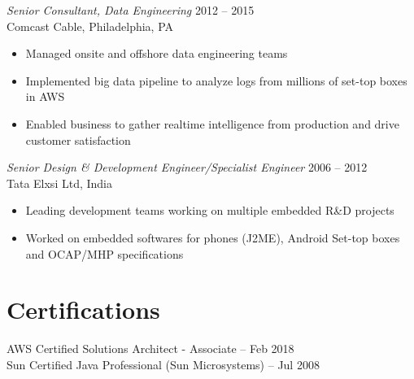 \documentclass[margin]{res}
\begin{document}
\begin{resume}
    {\sl Senior Consultant, Data Engineering} \hfill            2012 -- 2015 \\
    Comcast Cable, Philadelphia, PA
    \begin{itemize}  \itemsep -2pt %
        \item Managed onsite and offshore data engineering teams
        \item Implemented big data pipeline to analyze logs from millions of set-top boxes in AWS
        \item Enabled business to gather realtime intelligence from production and drive customer satisfaction
    \end{itemize}
    {\sl Senior Design \& Development Engineer/Specialist Engineer} \hfill        2006 -- 2012 \\
    Tata Elxsi Ltd, India
    \begin{itemize}
        \item Leading development teams working on multiple embedded R\&D projects
        \item Worked on embedded softwares for phones (J2ME), Android Set-top boxes and OCAP/MHP specifications
    \end{itemize}

    \section{Certifications}
    AWS Certified Solutions Architect - Associate -- Feb 2018\\
    Sun Certified Java Professional (Sun Microsystems) -- Jul 2008


\end{resume}
\end{document}
